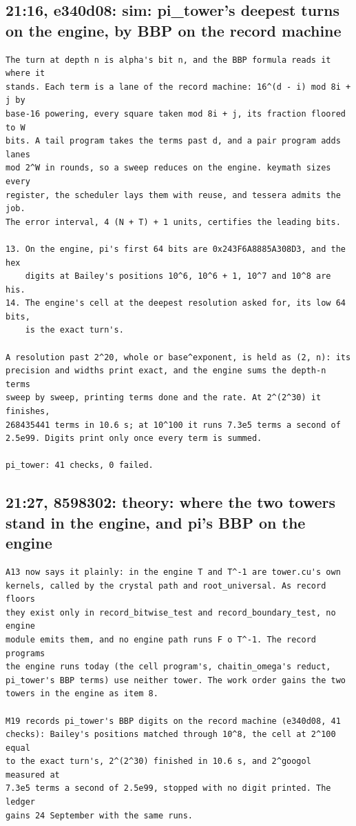 \subsection{\texorpdfstring{21:16, e340d08: sim: pi\_\allowbreak{}tower's deepest turns on the engine, by BBP on the record machine}{21:16, e340d08: sim: pi\_tower's deepest turns on the engine, by BBP on the record machine}}

\begin{Verbatim}
The turn at depth n is alpha's bit n, and the BBP formula reads it where it
stands. Each term is a lane of the record machine: 16^(d - i) mod 8i + j by
base-16 powering, every square taken mod 8i + j, its fraction floored to W
bits. A tail program takes the terms past d, and a pair program adds lanes
mod 2^W in rounds, so a sweep reduces on the engine. keymath sizes every
register, the scheduler lays them with reuse, and tessera admits the job.
The error interval, 4 (N + T) + 1 units, certifies the leading bits.

13. On the engine, pi's first 64 bits are 0x243F6A8885A308D3, and the hex
    digits at Bailey's positions 10^6, 10^6 + 1, 10^7 and 10^8 are his.
14. The engine's cell at the deepest resolution asked for, its low 64 bits,
    is the exact turn's.

A resolution past 2^20, whole or base^exponent, is held as (2, n): its
precision and widths print exact, and the engine sums the depth-n terms
sweep by sweep, printing terms done and the rate. At 2^(2^30) it finishes,
268435441 terms in 10.6 s; at 10^100 it runs 7.3e5 terms a second of
2.5e99. Digits print only once every term is summed.

pi_tower: 41 checks, 0 failed.
\end{Verbatim}

\subsection{\texorpdfstring{21:27, 8598302: theory: where the two towers stand in the engine, and pi's BBP on the engine}{21:27, 8598302: theory: where the two towers stand in the engine, and pi's BBP on the engine}}

\begin{Verbatim}
A13 now says it plainly: in the engine T and T^-1 are tower.cu's own
kernels, called by the crystal path and root_universal. As record floors
they exist only in record_bitwise_test and record_boundary_test, no engine
module emits them, and no engine path runs F o T^-1. The record programs
the engine runs today (the cell program's, chaitin_omega's reduct,
pi_tower's BBP terms) use neither tower. The work order gains the two
towers in the engine as item 8.

M19 records pi_tower's BBP digits on the record machine (e340d08, 41
checks): Bailey's positions matched through 10^8, the cell at 2^100 equal
to the exact turn's, 2^(2^30) finished in 10.6 s, and 2^googol measured at
7.3e5 terms a second of 2.5e99, stopped with no digit printed. The ledger
gains 24 September with the same runs.
\end{Verbatim}

